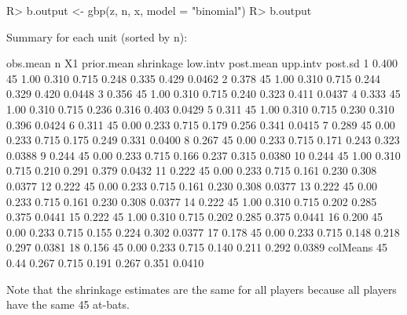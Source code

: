 \documentclass[article]{jss}
\begin{document}
\begin{CodeChunk}
\begin{CodeInput}
R> b.output <- gbp(z, n, x, model = "binomial")
R> b.output
\end{CodeInput}
\begin{CodeOutput}
Summary for each unit (sorted by n):

         obs.mean  n   X1 prior.mean shrinkage low.intv post.mean upp.intv post.sd
1           0.400 45 1.00      0.310     0.715    0.248     0.335    0.429  0.0462
2           0.378 45 1.00      0.310     0.715    0.244     0.329    0.420  0.0448
3           0.356 45 1.00      0.310     0.715    0.240     0.323    0.411  0.0437
4           0.333 45 1.00      0.310     0.715    0.236     0.316    0.403  0.0429
5           0.311 45 1.00      0.310     0.715    0.230     0.310    0.396  0.0424
6           0.311 45 0.00      0.233     0.715    0.179     0.256    0.341  0.0415
7           0.289 45 0.00      0.233     0.715    0.175     0.249    0.331  0.0400
8           0.267 45 0.00      0.233     0.715    0.171     0.243    0.323  0.0388
9           0.244 45 0.00      0.233     0.715    0.166     0.237    0.315  0.0380
10          0.244 45 1.00      0.310     0.715    0.210     0.291    0.379  0.0432
11          0.222 45 0.00      0.233     0.715    0.161     0.230    0.308  0.0377
12          0.222 45 0.00      0.233     0.715    0.161     0.230    0.308  0.0377
13          0.222 45 0.00      0.233     0.715    0.161     0.230    0.308  0.0377
14          0.222 45 1.00      0.310     0.715    0.202     0.285    0.375  0.0441
15          0.222 45 1.00      0.310     0.715    0.202     0.285    0.375  0.0441
16          0.200 45 0.00      0.233     0.715    0.155     0.224    0.302  0.0377
17          0.178 45 0.00      0.233     0.715    0.148     0.218    0.297  0.0381
18          0.156 45 0.00      0.233     0.715    0.140     0.211    0.292  0.0389
colMeans          45 0.44      0.267     0.715    0.191     0.267    0.351  0.0410
\end{CodeOutput}
\end{CodeChunk}

Note that the shrinkage estimates are the same for all players because all players have the same 45 at-bats. %
\end{document}
